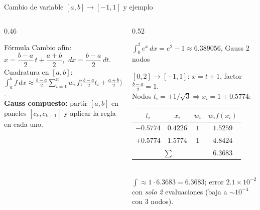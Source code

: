 \documentclass[aspectratio=169,10pt]{beamer}
\begin{document}
\begin{frame}{Cambio de variable $[a,b]\to[-1,1]$ y ejemplo}
\begin{columns}[T]
\begin{column}{0.46\textwidth}
\begin{cardidea}{Fórmula}{\faSuperscript}
{\footnotesize Cambio afín:\\[0.2mm]
$x=\dfrac{b-a}{2}\,t+\dfrac{a+b}{2}$, $\ dx=\dfrac{b-a}{2}\,dt$.\\[1.0mm]
Cuadratura en $[a,b]$:\\[0.2mm]
$\displaystyle\int_a^b f\,dx\approx\frac{b-a}{2}\sum_{i=1}^n w_i\,f\!\Big(\tfrac{b-a}{2}t_i+\tfrac{a+b}{2}\Big)$.\\[1.0mm]
\textbf{Gauss compuesto:} partir $[a,b]$ en paneles $[c_k,c_{k+1}]$ y aplicar la regla en cada uno.}
\end{cardidea}
\end{column}
\begin{column}{0.52\textwidth}
\begin{cardgear}{$\int_0^2 e^x\,dx=e^2-1\approx6.389056$, Gauss 2 nodos}{\faCalculator}
{\footnotesize $[0,2]\to[-1,1]$: $x=t+1$, factor $\tfrac{b-a}{2}=1$.\\[0.6mm]
Nodos $t_i=\pm1/\sqrt3\Rightarrow x_i=1\pm0.5774$:\\[0.4mm]
\centering
\renewcommand{\arraystretch}{1.25}\setlength{\tabcolsep}{6pt}
\begin{tabular}{c|c|c|c}
$t_i$ & $x_i$ & $w_i$ & $w_i f(x_i)$\\\hline
$-0.5774$ & $0.4226$ & $1$ & $1.5259$\\
$+0.5774$ & $1.5774$ & $1$ & $4.8424$\\\hline
\multicolumn{3}{c|}{$\sum$} & $6.3683$\\
\end{tabular}}\\[1.2mm]
{\footnotesize $\int\approx1\cdot6.3683=6.3683$; error $2.1{\times}10^{-2}$ con \emph{solo 2} evaluaciones (baja a $\sim10^{-4}$ con $3$ nodos).}
\end{cardgear}
\end{column}
\end{columns}
\end{frame}
\end{document}
